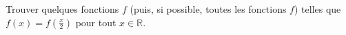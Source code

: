Trouver quelques fonctions $f$ (puis, si possible, toutes les fonctions $f$) telles que $f(x) = f\left(\frac{x}{2}\right)$ pour tout $x \in \mathbb{R}$.
